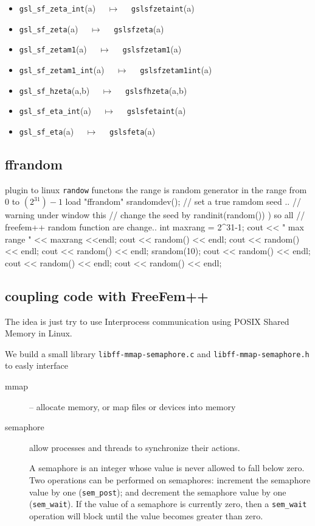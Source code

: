 \documentclass[a4paper,twoside,12pt]{book}
\begin{document}
{\begin{itemize}
\item \texttt{gsl\_sf\_zeta\_int}(a) $\quad \mapsto\quad $ \texttt{gslsfzetaint}(a) 
\item \texttt{gsl\_sf\_zeta}(a) $\quad \mapsto\quad $ \texttt{gslsfzeta}(a) 
\item \texttt{gsl\_sf\_zetam1}(a) $\quad \mapsto\quad $ \texttt{gslsfzetam1}(a) 
\item \texttt{gsl\_sf\_zetam1\_int}(a) $\quad \mapsto\quad $ \texttt{gslsfzetam1int}(a) 
\item \texttt{gsl\_sf\_hzeta}(a,b) $\quad \mapsto\quad $ \texttt{gslsfhzeta}(a,b) 
\item \texttt{gsl\_sf\_eta\_int}(a) $\quad \mapsto\quad $ \texttt{gslsfetaint}(a) 
\item \texttt{gsl\_sf\_eta}(a) $\quad \mapsto\quad $ \texttt{gslsfeta}(a) 
\end{itemize}

}
\subsection{ffrandom}
\label{section:ffrandom}

plugin to linux \texttt{randow} functons  the range is  random generator
in the range from $0$ to $(2^{31})-1$ 
\bFF
load "ffrandom"
srandomdev();  // set a true ramdom seed ..
//  warning under window this
// change the seed by  randinit(random()) ) so all
// freefem++ random function are change..
int maxrang = 2^31-1; 
cout << " max range " << maxrang <<endl;
cout << random() << endl;
cout << random() << endl;
cout << random() << endl;
srandom(10);
cout << random() << endl;
cout << random() << endl;
cout << random() << endl;

\eFF

\subsection{coupling code with FreeFem++}
\label{section:ff-mmap-semaphore}

The idea is just try to use 
Interprocess communication using POSIX Shared Memory in Linux.

We build a small library  \texttt{libff-mmap-semaphore.c} and  \texttt{libff-mmap-semaphore.h} to easly interface

\begin{description}
\item[mmap]   -- allocate memory, or map files or devices into memory
\item[semaphore]  allow processes and threads to synchronize their
       actions.

       A semaphore is an integer whose value is never allowed to fall below
       zero.  Two operations can be performed on semaphores: increment the
       semaphore value by one (\texttt{sem\_post}); and decrement the semaphore
       value by one (\texttt{sem\_wait}).  If the value of a semaphore is currently
       zero, then a \texttt{sem\_wait} operation will block until the value becomes
       greater than zero.
\end{description}
\end{document}
